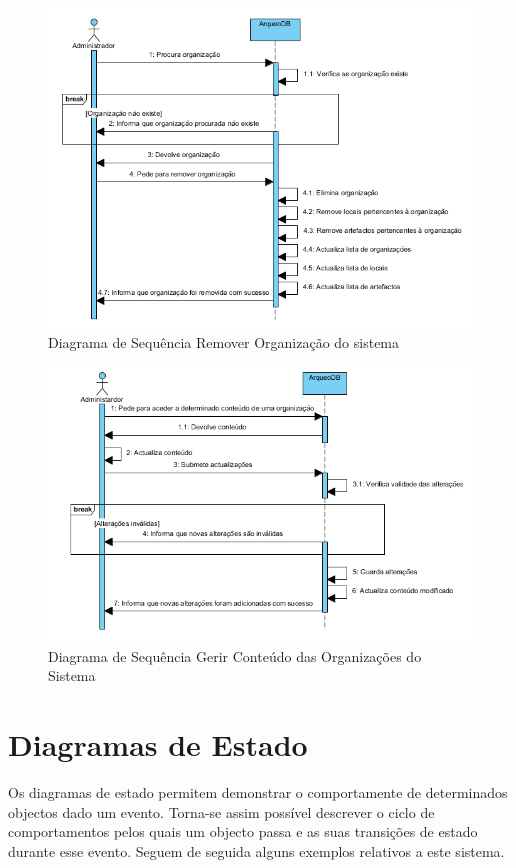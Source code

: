 ﻿\documentclass[12pt,a4paper]{article}
\begin{document}
\begin{figure}[h!]
\centering
\includegraphics[scale=1]{sequencia/A_removerorganizacao}
\caption{Diagrama de Sequência Remover Organização do sistema} 
\end{figure}  

\begin{figure}[h!]
\centering
\includegraphics[scale=1]{sequencia/gerirconteudo}
\caption{Diagrama de Sequência Gerir Conteúdo das Organizações do Sistema} 
\end{figure}  

\clearpage

\section{Diagramas de Estado}
Os diagramas de estado permitem demonstrar o comportamente de determinados objectos dado um evento. Torna-se assim possível descrever o ciclo de comportamentos pelos quais um objecto passa e as suas transições de estado durante esse evento. Seguem de seguida alguns exemplos relativos a este sistema.\\
\end{document}
